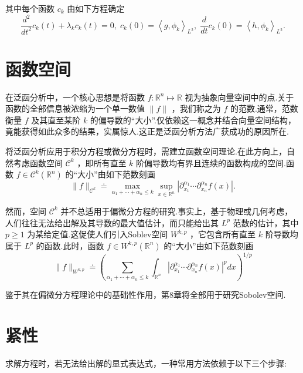 其中每个函数 ${c}_{k}$ 由如下方程确定
\[
\frac{{d}^{2}}{d{t}^{2}}{c}_{k}\left( t\right)  + {\lambda }_{k}{c}_{k}\left( t\right)  = 0,\;{c}_{k}\left( 0\right)  = {\left\langle  g,{\phi }_{k}\right\rangle  }_{L^2},\;\frac{d}{dt}{c}_{k}\left( 0\right)  = {\left\langle  h,{\phi }_{k}\right\rangle  }_{L^2}.
\]

\section{函数空间}

在泛函分析中，一个核心思想是将函数 $f : {\mathbb{R}}^{n} \mapsto  \mathbb{R}$ 视为抽象向量空间中的点.关于函数的全部信息被浓缩为一个单一数值 $\| f\|$ ，我们称之为 $f$ 的范数.通常，范数衡量 $f$ 及其直至某阶 $k$ 的偏导数的“大小”.仅依赖这一概念并结合向量空间结构，竟能获得如此众多的结果，实属惊人.这正是泛函分析方法广获成功的原因所在.

将泛函分析应用于积分方程或微分方程时，需建立函数空间理论.在此方向上，自然考虑函数空间 ${\mathcal{C}}^{k}$ ，即所有直至 $k$ 阶偏导数均有界且连续的函数构成的空间.函数 $f \in  {\mathcal{C}}^{k}\left( {\mathbb{R}}^{n}\right)$ 的“大小”由如下范数刻画
\[
\| f{\| }_{{\mathcal{C}}^{k}} \doteq  \mathop{\max }\limits_{{{\alpha }_{1} + \cdots  + {\alpha }_{n} \leq  k}}\mathop{\sup }\limits_{{x \in  {\mathbb{R}}^{n}}}\left| {{\partial }_{{x}_{1}}^{{\alpha }_{1}}\cdots {\partial }_{{x}_{n}}^{{\alpha }_{n}}f\left( x\right) }\right| .
\]

然而，空间 ${\mathcal{C}}^{k}$ 并不总适用于偏微分方程的研究.事实上，基于物理或几何考虑，人们往往无法给出解及其导数的最大值估计，而只能给出其 ${L}^{p}$ 范数的估计，其中 $p \geq  1$ 为某给定值.这促使人们引入Soblev空间 ${W}^{k,p}$ ，它包含所有直至 $k$ 阶导数均属于 ${L}^{p}$ 的函数.此时，函数 $f \in  {W}^{k,p}\left( {\mathbb{R}}^{n}\right)$ 的“大小”由如下范数刻画
\[
\| f{\| }_{{W}^{k,p}} \doteq  {\left( \mathop{\sum }\limits_{{{\alpha }_{1} + \cdots  + {\alpha }_{n} \leq  k}}{\int }_{{\mathbb{R}}^{n}}{\left| {\partial }_{{x}_{1}}^{{\alpha }_{1}}\cdots {\partial }_{{x}_{n}}^{{\alpha }_{n}}f\left( x\right) \right| }^{p}dx\right) }^{1/p}
\]

鉴于其在偏微分方程理论中的基础性作用，第8章将全部用于研究Sobolev空间.

\section{紧性}

求解方程时，若无法给出解的显式表达式，一种常用方法依赖于以下三个步骤:

